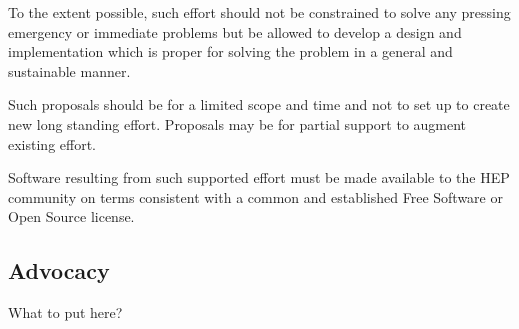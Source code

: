 To the extent possible, such effort should not be constrained to solve
any pressing emergency or immediate problems but be allowed to develop
a design and implementation which is proper for solving the problem in
a general and sustainable manner.

Such proposals should be for a limited scope and time and not to set
up to create new long standing effort.  Proposals may be for partial
support to augment existing effort.

Software resulting from such supported effort must be made available
to the HEP community on terms consistent with a common and established
Free Software or Open Source license.

\subsection{Advocacy}

What to put here?

